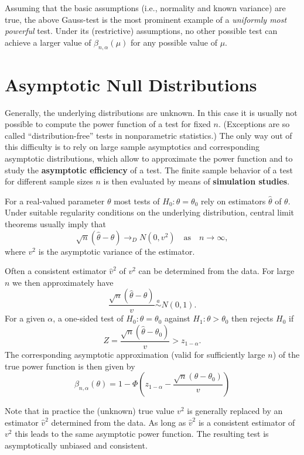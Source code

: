 \documentclass[
]{book}
\begin{document}
\hfill\break

Assuming that the basic assumptions (i.e., normality and known variance) are true, the above Gauss-test is the most prominent example of a \emph{uniformly most powerful} test. Under its (restrictive) assumptions, no other possible test can achieve a larger value of \(\beta_{n,\alpha}(\mu)\) for any possible value of \(\mu\).

\hypertarget{asymptotic-null-distributions}{%
\section{Asymptotic Null Distributions}\label{asymptotic-null-distributions}}

Generally, the underlying distributions are unknown. In this case it is usually not possible to compute the power function of a test for fixed \(n\). (Exceptions are so called ``distribution-free'' tests in nonparametric statistics.) The only way out of this difficulty is to rely on large sample asymptotics and corresponding asymptotic distributions, which allow to approximate the power function and to study the \textbf{asymptotic efficiency} of a test. The finite sample behavior of a test for different sample sizes \(n\) is then evaluated by means of \textbf{simulation studies}.

For a real-valued parameter \(\theta\) most tests of \(H_0:\theta=\theta_0\) rely on estimators \(\hat\theta\) of \(\theta\). Under suitable regularity conditions on the underlying distribution, central limit theorems usually imply that
\[\sqrt{n}(\hat\theta - \theta)\rightarrow_D N(0,v^2)\quad\text{as}\quad n\rightarrow\infty,\]
where \(v^2\) is the asymptotic variance of the estimator.

\hfill\break

Often a consistent estimator \(\hat v^2\) of \(v^2\) can be determined from the data. For large \(n\) we then approximately have
\[\frac{\sqrt{n}(\hat\theta - \theta)}{ v}\overset{a}{\sim} N(0,1).\]
For a given \(\alpha\), a one-sided test of \(H_0:\theta=\theta_0\) against \(H_1:\theta>\theta_0\) then rejects \(H_0\) if
\[
Z=\frac{\sqrt{n} (\hat\theta -\theta_0)}{v}>z_{1-\alpha}.
\]
The corresponding asymptotic approximation (valid for sufficiently large \(n\)) of the true power function is then given by
\[
\beta_{n,\alpha}(\theta) = 1-\Phi\left(z_{1-\alpha}-\frac{\sqrt{n} (\theta -\theta_0)}{v}\right)
\]

\hfill\break

Note that in practice the (unknown) true value \(v^2\) is generally replaced by an estimator \(\hat v^2\) determined from the data. As long as \(\hat v^2\) is a consistent estimator of \(v^2\) this leads to the same asymptotic power function. The resulting test is asymptotically unbiased and consistent.
\end{document}
